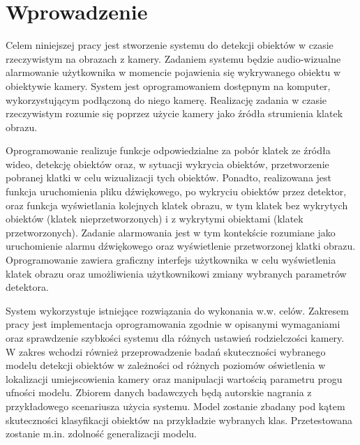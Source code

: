 \chapter{Wprowadzenie}
Celem niniejszej pracy jest stworzenie systemu do detekcji obiektów w czasie rzeczywistym na obrazach z kamery. Zadaniem systemu będzie audio-wizualne alarmowanie użytkownika w momencie pojawienia się wykrywanego obiektu w obiektywie kamery. System jest oprogramowaniem dostępnym na komputer, wykorzystującym podłączoną do niego kamerę. Realizację zadania w czasie rzeczywistym rozumie się poprzez użycie kamery jako źródła strumienia klatek obrazu. 

Oprogramowanie realizuje funkcje odpowiedzialne za pobór klatek ze źródła wideo, detekcję obiektów oraz, w sytuacji wykrycia obiektów, przetworzenie pobranej klatki w celu wizualizacji tych obiektów. Ponadto, realizowana jest funkcja uruchomienia pliku dźwiękowego, po wykryciu obiektów przez detektor, oraz funkcja wyświetlania kolejnych klatek obrazu, w tym klatek bez wykrytych obiektów (klatek nieprzetworzonych) i z wykrytymi obiektami (klatek przetworzonych). Zadanie alarmowania jest w tym kontekście rozumiane jako uruchomienie alarmu dźwiękowego oraz wyświetlenie przetworzonej klatki obrazu. Oprogramowanie zawiera graficzny interfejs użytkownika w celu wyświetlenia klatek obrazu oraz umożliwienia użytkownikowi zmiany wybranych parametrów detektora.

System wykorzystuje istniejące rozwiązania do wykonania w.w. celów. Zakresem pracy jest implementacja oprogramowania zgodnie w opisanymi wymaganiami oraz sprawdzenie szybkości systemu dla różnych ustawień rodzielczości kamery. 
W zakres wchodzi również przeprowadzenie badań skuteczności wybranego modelu detekcji obiektów w zależności od różnych poziomów oświetlenia w lokalizacji umiejscowienia kamery oraz manipulacji wartością parametru progu ufności modelu. Zbiorem danych badawczych będą autorskie nagrania z przykładowego scenariusza użycia systemu. Model zostanie zbadany pod kątem skuteczności klasyfikacji obiektów na przykładzie wybranych klas. Przetestowana zostanie m.in. zdolność generalizacji modelu.     
